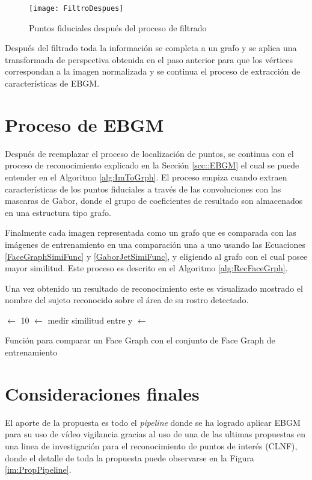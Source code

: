 \begin{figure}[h]
\center
\texttt{[image: FiltroDespues]}
\caption{Puntos fiduciales después del proceso de filtrado}
\label{im:22Landmark}
\end{figure}

Después del filtrado toda la información se completa a un grafo y se aplica una transformada de perspectiva obtenida en el paso anterior para que los vértices correspondan a la imagen normalizada y se continua el proceso de extracción de características de \ac{EBGM}.{}

\section{Proceso de \ac{EBGM}}
Después de reemplazar el proceso de localización de puntos, se continua con el proceso de reconocimiento explicado en la Sección \ref{scc::EBGM} el cual se puede entender en el Algoritmo \ref{alg:ImToGrph}. El proceso empiza cuando extraen características de los puntos fiduciales a través de las convoluciones con las mascaras de Gabor, donde el grupo de coeficientes de resultado son almacenados en una estructura tipo grafo.

Finalmente cada imagen representada como un grafo que es comparada con las imágenes de entrenamiento en una comparación una a uno usando las Ecuaciones \ref{FaceGraphSimiFunc} y \ref{GaborJetSimiFunc}, y eligiendo al grafo con el cual posee mayor similitud. Este proceso es descrito en el Algoritmo \ref{alg:RecFaceGrph}.

Una vez obtenido un resultado de reconocimiento este es visualizado mostrado el nombre del sujeto reconocido sobre el área de su rostro detectado.

\begin{algorithm}
\;
 $\gets$ 10\;
{
	 $\gets$ medir similitud entre  y \;
    {
    	 $\gets$ \;
    }
}
\;
\caption{Función para comparar un Face Graph con el conjunto de Face Graph de entrenamiento}
\label{alg:RecFaceGrph}
\end{algorithm}

\section{Consideraciones finales}
El aporte de la propuesta es todo el \textit{pipeline} donde se ha logrado aplicar \ac{EBGM} para su uso de vídeo vigilancia gracias al uso de una de las ultimas propuestas en una linea de investigación para el reconocimiento de puntos de interés (\ac{CLNF}), donde el detalle de toda la propuesta puede observarse en la Figura \ref{im:PropPipeline}. 

